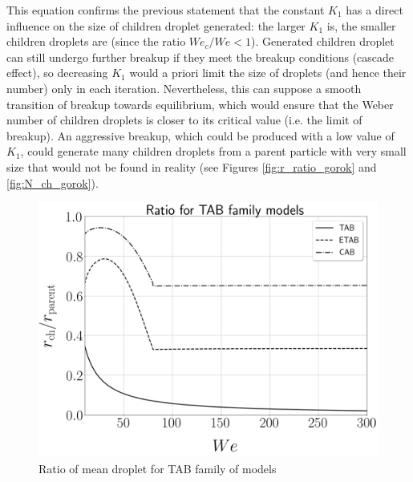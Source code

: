 This equation confirms the previous statement that the constant $K_1$ has a direct influence on the size of children droplet generated: the larger $K_1$ is, the smaller children droplets are (since the ratio $We_c/We < 1$). Generated children droplet can still undergo further breakup if they meet the breakup conditions (cascade effect), so decreasing $K_1$ would a priori limit the size of droplets (and hence their number) only in each iteration. Nevertheless, this can suppose a smooth transition of breakup towards equilibrium, which would ensure that the Weber number of children droplets is closer to its critical value (i.e. the limit of breakup). An aggressive breakup, which could be produced with a low value of $K_1$, could generate many children droplets from a parent particle with very small size that would not be found in reality (see Figures \ref{fig:r_ratio_gorok} and \ref{fig:N_ch_gorok}).



\begin{figure}[h!]
	\centering
	\includegraphics[scale=0.2]{./part2_developments/figures_ch4_SLI/ratio_droplet_size_TAB}
	\caption{Ratio of mean droplet for TAB family of models}
	\label{fig:r_ratio_TAB}
\end{figure}

